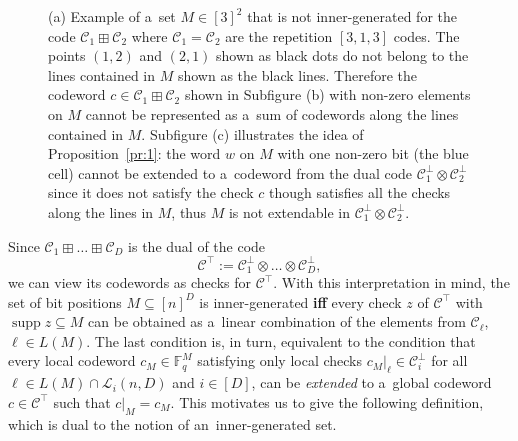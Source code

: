 \documentclass[conference]{IEEEtran}
\newcommand{\Iff}{\textbf{if\textcompwordmark f} }
\theoremstyle{plain}
\theoremstyle{definition}
\theoremstyle{remark}
\newcommand{\cC}{\mathcal{C}}
\newcommand{\cL}{\mathcal{L}}
\newcommand{\F}{\mathbb{F}}
\DeclareMathOperator{\supp}{supp}
\begin{document}
\begin{figure}[hbt]

    \caption{(a) Example of a~set $M\in [3]^2$ that is not inner-generated for the code $\cC_1\boxplus \cC_2$ where $\cC_1=\cC_2$ are the repetition $[3,1,3]$ codes. The points $(1,2)$ and $(2,1)$ shown as black dots do not belong to the lines contained in $M$ shown as the black lines. Therefore the codeword $c\in \cC_1\boxplus \cC_2$ shown in Subfigure (b) with non-zero elements on $M$ cannot be represented as a~sum of codewords along the lines contained in $M$. Subfigure (c) illustrates the idea of Proposition~\ref{pr:1}: the word $w$ on $M$ with one non-zero bit (the blue cell) cannot be extended to a~codeword from the dual code $\cC_1^\perp\otimes\cC_2^\perp$ since it does not satisfy the check $c$ though satisfies all the checks along the lines in $M$, thus $M$ is not extendable in $\cC_1^\perp\otimes\cC_2^\perp$.}
    \label{fig:inner-gen}
\end{figure}

Since $\cC_1\boxplus\ldots\boxplus \cC_D$ is the dual of the code 
\[\cC^\top := \cC_1^\perp\otimes\ldots\otimes \cC_D^\perp,\] we can view its codewords as checks for $\cC^\top$. With this interpretation in mind, the set of bit positions $M\subseteq [n]^D$ is inner-generated \Iff every check $z$ of $\cC^\top$  with $\supp z \subseteq M$ can be obtained as a~linear combination of the elements from $\cC_\ell$, $\ell\in L(M)$. The last condition is, in turn, equivalent to the condition that every local codeword $c_M \in \F_q^M$ satisfying only local checks $c_M|_\ell \in \cC_i^\perp$ for all $\ell\in L(M)\cap \cL_i(n, D)$ and $i\in [D]$, can be \emph{extended} to a~global codeword $c\in \cC^\top$ such that $c|_M = c_M$. This motivates us to give the following definition, which is dual to the notion of an~inner-generated set. 
\end{document}
